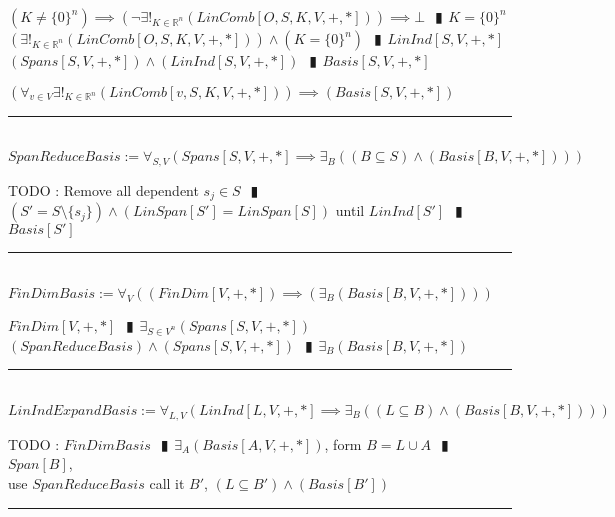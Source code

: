 \documentclass{book}
\newcommand{\abr}{:=}
\newcommand{\pipe}{$\phantom{(}\vrectangleblack\phantom{)}$}
\newcommand{\pr}[1]{\left(#1\right)}
\begin{document}
\begin{enumerate}
\begin{enumerate}
    \lit $(K \neq \{0\}^n) \implies \pr{\lnot \exists!_{K \in \mathbb{R}^n}(LinComb[O, S, K, V, +, *])} \implies \bot$ \pipe $K = \{0\}^n$
    \lit $\pr{\exists!_{K \in \mathbb{R}^n}(LinComb[O, S, K, V, +, *])} \land (K = \{0\}^n)$ \pipe $LinInd[S, V, +, *]$
    \lit $(Spans[S, V, +, *]) \land (LinInd[S, V, +, *])$ \pipe $Basis[S, V, +, *]$
  \end{enumerate}
  \lit $\pr{\forall_{v \in V} \exists!_{K \in \mathbb{R}^n}(LinComb[v, S, K, V, +, *])} \implies (Basis[S, V, +, *])$
\end{enumerate} \vspace{.75mm} \hrule \vspace{.75mm} \ \\ 

$SpanReduceBasis \abr \forall_{S, V}\pr{Spans[S, V, +, *] \implies \exists_{B}\pr{(B \subseteq S) \land (Basis[B, V, +, *])}}$
\begin{enumerate}
  \lit TODO : Remove all dependent $s_j \in S$ \pipe $(S' = S \setminus \{s_j\}) \land (LinSpan[S'] = LinSpan[S])$ until $LinInd[S']$ \pipe $Basis[S']$
\end{enumerate} \vspace{.75mm} \hrule \vspace{.75mm} \ \\ 

$FinDimBasis \abr \forall_{V}\pr{(FinDim[V, +, *]) \implies \pr{\exists_{B}(Basis[B, V, +, *])}}$
\begin{enumerate}
  \lit $FinDim[V, +, *]$ \pipe $\exists_{S \in V^n}(Spans[S, V, +, *])$
  \lit $(SpanReduceBasis) \land (Spans[S, V, +, *])$ \pipe $\exists_{B}(Basis[B, V, +, *])$
\end{enumerate} \vspace{.75mm} \hrule \vspace{.75mm} \ \\ 

$LinIndExpandBasis \abr \forall_{L, V}\pr{LinInd[L, V, +, *] \implies \exists_{B}\pr{(L \subseteq B) \land (Basis[B, V, +, *])}}$
\begin{enumerate}
  \lit TODO : $FinDimBasis$ \pipe $\exists_{A}(Basis[A, V, +, *])$, form $B = L \cup A$ \pipe $Span[B]$, \\
      use $SpanReduceBasis$ call it $B'$, $(L \subseteq B') \land (Basis[B'])$
\end{enumerate} \vspace{.75mm} \hrule \vspace{.75mm} \ \\ 
\end{document}
